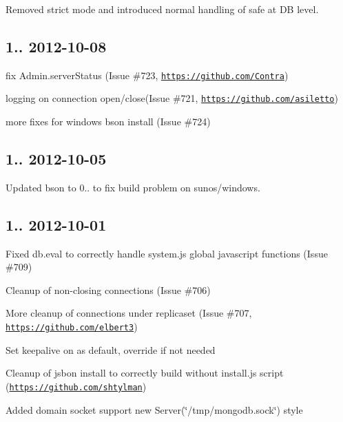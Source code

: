 \begin{DoxyItemize}
\item Removed strict mode and introduced normal handling of safe at DB level.
\end{DoxyItemize}

\subsection*{1.. 2012-\/10-\/08 }


\begin{DoxyItemize}
\item fix Admin.\+server\+Status (Issue \#723, \href{https://github.com/Contra}{\tt https\+://github.\+com/\+Contra})
\item logging on connection open/close(Issue \#721, \href{https://github.com/asiletto}{\tt https\+://github.\+com/asiletto})
\item more fixes for windows bson install (Issue \#724)
\end{DoxyItemize}

\subsection*{1.. 2012-\/10-\/05 }


\begin{DoxyItemize}
\item Updated bson to 0.. to fix build problem on sunos/windows.
\end{DoxyItemize}

\subsection*{1.. 2012-\/10-\/01 }


\begin{DoxyItemize}
\item Fixed db.\+eval to correctly handle system.\+js global javascript functions (Issue \#709)
\item Cleanup of non-\/closing connections (Issue \#706)
\item More cleanup of connections under replicaset (Issue \#707, \href{https://github.com/elbert3}{\tt https\+://github.\+com/elbert3})
\item Set keepalive on as default, override if not needed
\item Cleanup of jsbon install to correctly build without install.\+js script (\href{https://github.com/shtylman}{\tt https\+://github.\+com/shtylman})
\item Added domain socket support new Server(\char`\"{}/tmp/mongodb.\+sock\char`\"{}) style
\end{DoxyItemize}

